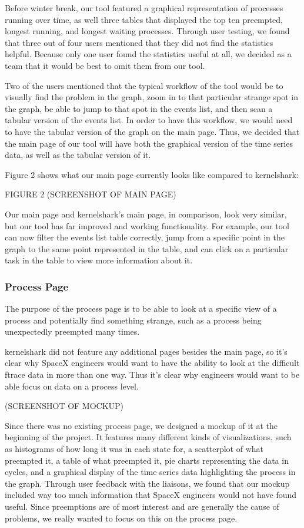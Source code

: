 \documentclass{hmcclinic}
\begin{document}
Before winter break, our tool featured a graphical representation of processes running over time, as well three tables that displayed the top ten preempted, longest running, and longest waiting processes. Through user testing, we found that three out of four users mentioned that they did not find the statistics helpful. Because only one user found the statistics useful at all, we decided as a team that it would be best to omit them from our tool.

Two of the users mentioned that the typical workflow of the tool would be to visually find the problem in the graph, zoom in to that particular strange spot in the graph, be able to jump to that spot in the events list, and then scan a tabular version of the events list. In order to have this workflow, we would need to have the tabular version of the graph on the main page. Thus, we decided that the main page of our tool will have both the graphical version of the time series data, as well as the tabular version of it.

Figure 2 shows what our main page currently looks like compared to kernelshark:

FIGURE 2 (SCREENSHOT OF MAIN PAGE)

Our main page and kernelshark's main page, in comparison, look very similar, but our tool has far improved and working functionality. For example, our tool can now filter the events list table correctly, jump from a specific point in the graph to the same point represented in the table, and can click on a particular task in the table to view more information about it.

\subsubsection{Process Page}
The purpose of the process page is to be able to look at a specific view of a process and potentially find something strange, such as a process being unexpectedly preempted many times.

kernelshark did not feature any additional pages besides the main page, so it's clear why SpaceX engineers would want to have the ability to look at the difficult ftrace data in more than one way. Thus it's clear why engineers would want to be able focus on data on a process level.

(SCREENSHOT OF MOCKUP)

Since there was no existing process page, we designed a mockup of it at the beginning of the project. It features many different kinds of visualizations, such as histograms of how long it was in each state for, a scatterplot of what preempted it, a table of what preempted it, pie charts representing the data in cycles, and a graphical display of the time series data highlighting the process in the graph. Through user feedback with the liaisons, we found that our mockup included way too much information that SpaceX engineers would not have found useful. Since preemptions are of most interest and are generally the cause of problems, we really wanted to focus on this on the process page.
\end{document}
